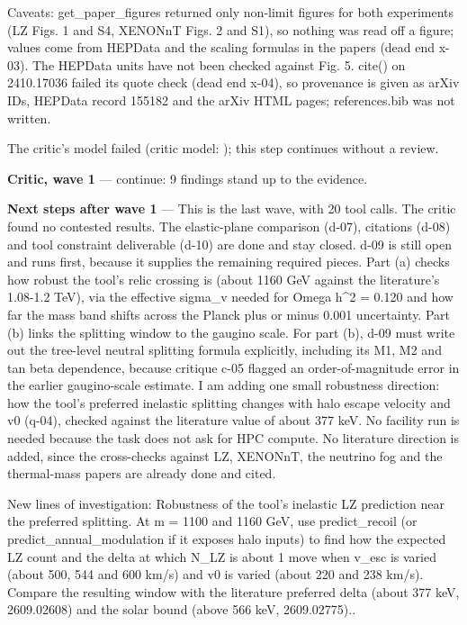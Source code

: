 \documentclass[11pt,a4paper]{article}
\begin{document}
Caveats: get\_paper\_figures returned only non-limit figures for both experiments (LZ Figs. 1 and S4, XENONnT Figs. 2 and S1), so nothing was read off a figure; values come from HEPData and the scaling formulas in the papers (dead end x-03). The HEPData units have not been checked against Fig. 5. cite() on 2410.17036 failed its quote check (dead end x-04), so provenance is given as arXiv IDs, HEPData record 155182 and the arXiv HTML pages; references.bib was not written.

The critic's model failed (critic model: ); this step continues without a review.

\textbf{Critic, wave 1} --- continue: 9 findings stand up to the evidence.

\textbf{Next steps after wave 1} --- This is the last wave, with 20 tool calls. The critic found no contested results. The elastic-plane comparison (d-07), citations (d-08) and tool constraint deliverable (d-10) are done and stay closed. d-09 is still open and runs first, because it supplies the remaining required pieces. Part (a) checks how robust the tool's relic crossing is (about 1160 GeV against the literature's 1.08-1.2 TeV), via the effective sigma\_v needed for Omega h\textasciicircum{}2 = 0.120 and how far the mass band shifts across the Planck plus or minus 0.001 uncertainty. Part (b) links the splitting window to the gaugino scale. For part (b), d-09 must write out the tree-level neutral splitting formula explicitly, including its M1, M2 and tan beta dependence, because critique c-05 flagged an order-of-magnitude error in the earlier gaugino-scale estimate. I am adding one small robustness direction: how the tool's preferred inelastic splitting changes with halo escape velocity and v0 (q-04), checked against the literature value of about 377 keV. No facility run is needed because the task does not ask for HPC compute. No literature direction is added, since the cross-checks against LZ, XENONnT, the neutrino fog and the thermal-mass papers are already done and cited.

New lines of investigation: Robustness of the tool's inelastic LZ prediction near the preferred splitting. At m = 1100 and 1160 GeV, use predict\_recoil (or predict\_annual\_modulation if it exposes halo inputs) to find how the expected LZ count and the delta at which N\_LZ is about 1 move when v\_esc is varied (about 500, 544 and 600 km/s) and v0 is varied (about 220 and 238 km/s). Compare the resulting window with the literature preferred delta (about 377 keV, 2609.02608) and the solar bound (above 566 keV, 2609.02775)..
\end{document}
